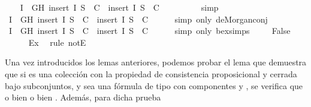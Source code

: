 \begin{isabellebody}
\ \ \isamarkupfalse%
\ {\isachardoublequoteopen}{\isasymforall}I\ {\isasymin}\ {\isacharbraceleft}G{\isacharcomma}H{\isacharbraceright}{\isachardot}\ insert\ I\ {\isacharquery}S{}\ {\isasymnotin}\ C\ {\isasymor}\ insert\ I\ {\isacharquery}S{}\ {\isasymnotin}\ C{\isachardoublequoteclose}\isanewline
\ \ \ \ \isamarkupfalse%
\ {}\ {}\ \isamarkupfalse%
\ simp\isanewline
\ \ \isamarkupfalse%
\ \isamarkupfalse%
\ {\isachardoublequoteopen}{\isasymforall}I\ {\isasymin}\ {\isacharbraceleft}G{\isacharcomma}H{\isacharbraceright}{\isachardot}\ {\isasymnot}{\isacharparenleft}insert\ I\ {\isacharquery}S{}\ {\isasymin}\ C\ {\isasymand}\ insert\ I\ {\isacharquery}S{}\ {\isasymin}\ C{\isacharparenright}{\isachardoublequoteclose}\isanewline
\ \ \ \ \isamarkupfalse%
\ {\isacharparenleft}simp\ only{\isacharcolon}\ de{\isacharunderscore}Morgan{\isacharunderscore}conj{\isacharparenright}\isanewline
\ \ \isamarkupfalse%
\ \isamarkupfalse%
\ {\isachardoublequoteopen}{\isasymnot}{\isacharparenleft}{\isasymexists}I\ {\isasymin}\ {\isacharbraceleft}G{\isacharcomma}H{\isacharbraceright}{\isachardot}\ insert\ I\ {\isacharquery}S{}\ {\isasymin}\ C\ {\isasymand}\ insert\ I\ {\isacharquery}S{}\ {\isasymin}\ C{\isacharparenright}{\isachardoublequoteclose}\isanewline
\ \ \ \ \isamarkupfalse%
\ {\isacharparenleft}simp\ only{\isacharcolon}\ bex{\isacharunderscore}simps{\isacharparenleft}{}{\isacharparenright}{\isacharparenright}\ \isanewline
\ \ \isamarkupfalse%
\ {\isachardoublequoteopen}False{\isachardoublequoteclose}\isanewline
\ \ \ \ \isamarkupfalse%
\ Ex\ \isamarkupfalse%
\ {\isacharparenleft}rule\ notE{\isacharparenright}\isanewline
{}\isamarkupfalse%
%
\endisatagproof
{\isafoldproof}%
%
\isadelimproof
%
\endisadelimproof
%
\begin{isamarkuptext}%
Una vez introducidos los lemas anteriores, podemos probar el lema  que
  demuestra que si  es una colección con la propiedad de consistencia proposicional y cerrada 
  bajo subconjuntos,  y sea  una fórmula de tipo \isa{{\isasymbeta}} con componentes  y , se 
  verifica que o bien  o bien . Además, para dicha prueba 

\end{isamarkuptext}
\end{isabellebody}

